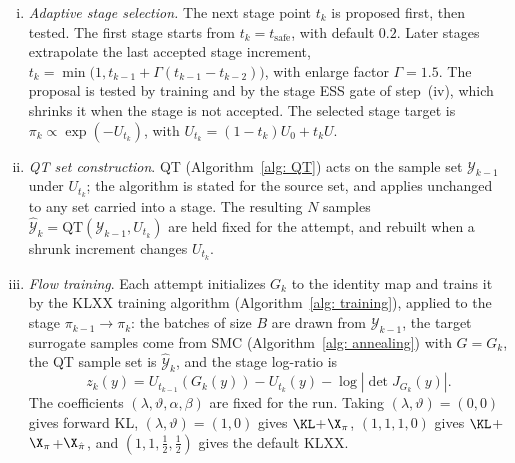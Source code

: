 \documentclass{article}
\begin{document}
\begin{enumerate}[(i)]
\item \emph{Adaptive stage selection.} The next stage point $t_k$ is proposed first, then tested. The first stage starts from $t_k=t_{\mathrm{safe}}$, with default $0.2$. Later stages extrapolate the last accepted stage increment, $t_k=\min\bigl(1,t_{k-1}+\Gamma(t_{k-1}-t_{k-2})\bigr)$, with enlarge factor $\Gamma=1.5$. The proposal is tested by training and by the stage ESS gate of step~(iv), which shrinks it when the stage is not accepted. The selected stage target is $\pi_k\propto\exp(-U_{t_k})$, with $U_{t_k}=(1-t_k)U_0+t_kU$.

\item \emph{QT set construction}. QT (Algorithm~\ref{alg: QT}) acts on the sample set $\mathcal Y_{k-1}$ under $U_{t_k}$; the algorithm is stated for the source set, and applies unchanged to any set carried into a stage. The resulting $N$ samples $\hat{\mathcal Y}_k=\mathrm{QT}(\mathcal Y_{k-1},U_{t_k})$ are held fixed for the attempt, and rebuilt when a shrunk increment changes $U_{t_k}$.

\item \emph{Flow training}. Each attempt initializes $G_k$ to the identity map and trains it by the KLXX training algorithm (Algorithm~\ref{alg: training}), applied to the stage $\pi_{k-1}\to\pi_k$: the batches of size $B$ are drawn from $\mathcal Y_{k-1}$, the target surrogate samples come from SMC (Algorithm~\ref{alg: annealing}) with $G=G_k$, the QT sample set is $\hat{\mathcal Y}_k$, and the stage log-ratio is
\begin{equation*}
    z_k(y) = U_{t_{k-1}}(G_k(y)) - U_{t_k}(y) - \log|\det J_{G_k}(y)|.
\end{equation*}
The coefficients $(\lambda,\vartheta,\alpha,\beta)$ are fixed for the run. Taking $(\lambda,\vartheta)=(0,0)$ gives forward KL, $(\lambda,\vartheta)=(1,0)$ gives $\KL$+$\X_{\pi}$, $(1,1,1,0)$ gives $\KL$+$\X_\pi$+$\X_{\hat\pi}$, and $(1,1,\frac12,\frac12)$ gives the default KLXX.


\end{enumerate}
\end{document}

